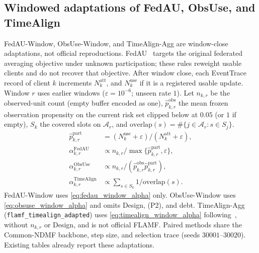 \subsection{Windowed adaptations of FedAU, ObsUse, and TimeAlign}
\label{app:adapted_baselines}
FedAU-Window, ObsUse-Window, and TimeAlign-Agg are window-close
adaptations, not official reproductions.
FedAU~\cite{wang2024lightweight} targets the original federated averaging
objective under unknown participation; these rules reweight usable clients
and do not recover that objective.
After window close, each EventTrace record of client \(k\) increments
\(N^{\mathrm{att}}_k\), and \(N^{\mathrm{use}}_k\) if it is a registered
usable update.  Window \(r\) uses earlier windows
(\(\varepsilon=10^{-6}\); unseen rate \(1\)).
Let \(n_{k,r}\) be the observed-unit count (empty buffer encoded as one),
\(\widehat p^{\mathrm{obs}}_{k,r}\) the mean frozen observation propensity
on the current risk set clipped below at \(0.05\) (or \(1\) if empty),
\(S_k\) the covered slots on \(\mathcal{A}_r\), and
\(\mathrm{overlap}(s)=\#\{j\in\mathcal{A}_r:s\in S_j\}\).
\begin{align}
 \widehat p^{\mathrm{part}}_{k,r}
 &=
 (N^{\mathrm{use}}_k+\varepsilon)/(N^{\mathrm{att}}_k+\varepsilon),
 \label{eq:fedau_part_rate}\\
 \alpha^{\mathrm{FedAU}}_{k,r}
 &\propto n_{k,r}/\max\{\widehat p^{\mathrm{part}}_{k,r},\varepsilon\},
 \label{eq:fedau_window_alpha}\\
 \alpha^{\mathrm{ObsUse}}_{k,r}
 &\propto n_{k,r}/(\widehat p^{\mathrm{obs}}_{k,r}\widehat p^{\mathrm{part}}_{k,r}),
 \label{eq:obsuse_window_alpha}\\
 \alpha^{\mathrm{TimeAlign}}_{k,r}
 &\propto \sum_{s\in S_k}1/\mathrm{overlap}(s).
 \label{eq:timealign_window_alpha}
\end{align}
FedAU-Window uses \eqref{eq:fedau_window_alpha} only.
ObsUse-Window uses \eqref{eq:obsuse_window_alpha} and omits Design, (P2), and debt.
TimeAlign-Agg (\texttt{flamf\_timealign\_adapted}) uses
\eqref{eq:timealign_window_alpha} following~\cite{wang2026federated},
without \(n_{k,r}\) or Design, and is not official FLAMF.
Paired methods share the Common-NDMF backbone, step size, and selection
trace (seeds \(30001\)--\(30020\)).  Existing tables already report
these adaptations.

